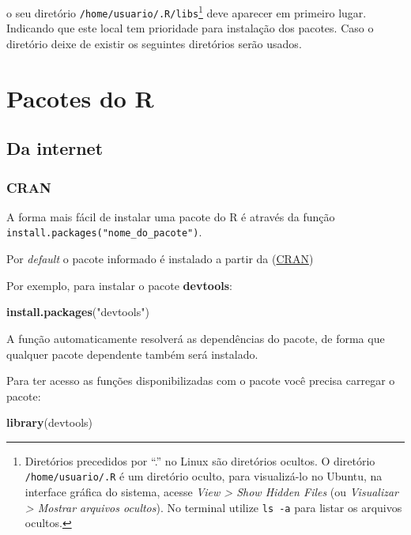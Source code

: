 \documentclass[]{book}
\newenvironment{Shaded}{\begin{snugshade}}{\end{snugshade}}
\newcommand{\KeywordTok}[1]{\textcolor[rgb]{0.13,0.29,0.53}{\textbf{#1}}}
\newcommand{\StringTok}[1]{\textcolor[rgb]{0.31,0.60,0.02}{#1}}
\newcommand{\NormalTok}[1]{#1}
\let\rmarkdownfootnote\footnote%
\def\footnote{\protect\rmarkdownfootnote}
\begin{document}
o seu diretório \texttt{/home/usuario/.R/libs}\footnote{Diretórios
  precedidos por ``.'' no Linux são diretórios ocultos. O diretório
  \texttt{/home/usuario/.R} é um diretório oculto, para visualizá-lo no
  Ubuntu, na interface gráfica do sistema, acesse \emph{View
  \textgreater{} Show Hidden Files} (ou \emph{Visualizar \textgreater{}
  Mostrar arquivos ocultos}). No terminal utilize \texttt{ls\ -a} para
  listar os arquivos ocultos.} deve aparecer em primeiro lugar.
Indicando que este local tem prioridade para instalação dos pacotes.
Caso o diretório deixe de existir os seguintes diretórios serão usados.

\section{Pacotes do R}\label{install-pck}

\subsection{Da internet}\label{da-internet}

\subsubsection{CRAN}\label{cran}

A forma mais fácil de instalar uma pacote do R é através da função
\texttt{install.packages("nome\_do\_pacote")}.

Por \emph{default} o pacote informado é instalado a partir da
(\href{https://cran.r-project.org/}{CRAN})

Por exemplo, para instalar o pacote \textbf{devtools}:

\begin{Shaded}
\begin{Highlighting}[]
\KeywordTok{install.packages}\NormalTok{(}\StringTok{"devtools"}\NormalTok{)}
\end{Highlighting}
\end{Shaded}

A função automaticamente resolverá as dependências do pacote, de forma
que qualquer pacote dependente também será instalado.

Para ter acesso as funções disponibilizadas com o pacote você precisa
carregar o pacote:

\begin{Shaded}
\begin{Highlighting}[]
\KeywordTok{library}\NormalTok{(devtools)}
\end{Highlighting}
\end{Shaded}
\end{document}
